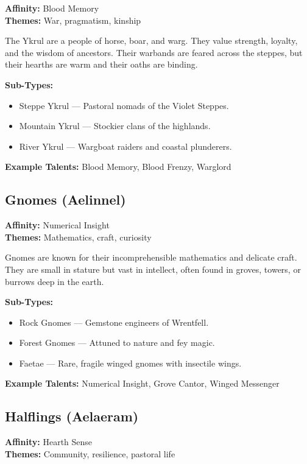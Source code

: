 \textbf{Affinity:} Blood Memory \\
\textbf{Themes:} War, pragmatism, kinship

The Ykrul are a people of horse, boar, and warg. They value strength, loyalty, and the wisdom of ancestors. Their warbands are feared across the steppes, but their hearths are warm and their oaths are binding.

\textbf{Sub-Types:}
\begin{itemize}
  \item Steppe Ykrul — Pastoral nomads of the Violet Steppes.
  \item Mountain Ykrul — Stockier clans of the highlands.
  \item River Ykrul — Wargboat raiders and coastal plunderers.
\end{itemize}

\textbf{Example Talents:} Blood Memory, Blood Frenzy, Warglord

\subsection*{Gnomes (Aelinnel)}

\textbf{Affinity:} Numerical Insight \\
\textbf{Themes:} Mathematics, craft, curiosity

Gnomes are known for their incomprehensible mathematics and delicate craft. They are small in stature but vast in intellect, often found in groves, towers, or burrows deep in the earth.

\textbf{Sub-Types:}
\begin{itemize}
  \item Rock Gnomes — Gemstone engineers of Wrentfell.
  \item Forest Gnomes — Attuned to nature and fey magic.
  \item Faetae — Rare, fragile winged gnomes with insectile wings.
\end{itemize}

\textbf{Example Talents:} Numerical Insight, Grove Cantor, Winged Messenger

\subsection*{Halflings (Aelaeram)}

\textbf{Affinity:} Hearth Sense \\
\textbf{Themes:} Community, resilience, pastoral life

